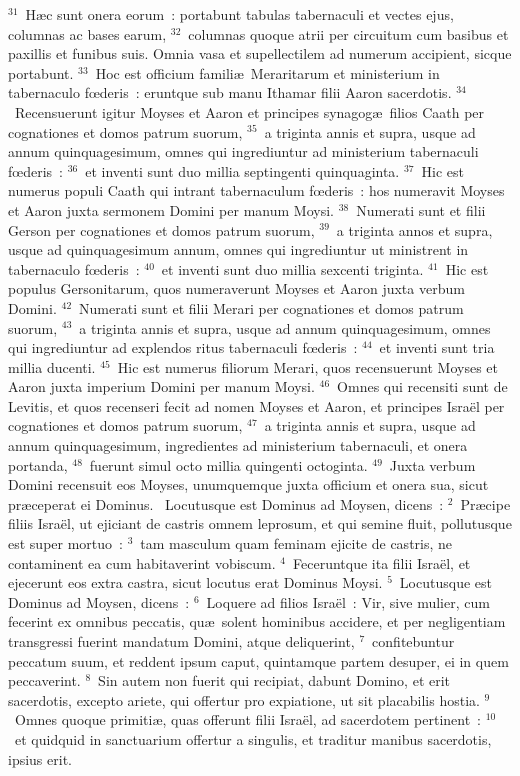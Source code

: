 ${}^{31}$~H\ae c sunt onera eorum~: portabunt tabulas tabernaculi et vectes ejus, columnas ac bases earum,
${}^{32}$~columnas quoque atrii per circuitum cum basibus et paxillis et funibus suis. Omnia vasa et supellectilem ad numerum accipient, sicque portabunt.
${}^{33}$~Hoc est officium famili\ae\ Meraritarum et ministerium in tabernaculo fœderis~: eruntque sub manu Ithamar filii Aaron sacerdotis.
${}^{34}$~Recensuerunt igitur Moyses et Aaron et principes synagog\ae\ filios Caath per cognationes et domos patrum suorum,
${}^{35}$~a triginta annis et supra, usque ad annum quinquagesimum, omnes qui ingrediuntur ad ministerium tabernaculi fœderis~:
${}^{36}$~et inventi sunt duo millia septingenti quinquaginta.
${}^{37}$~Hic est numerus populi Caath qui intrant tabernaculum fœderis~: hos numeravit Moyses et Aaron juxta sermonem Domini per manum Moysi.
${}^{38}$~Numerati sunt et filii Gerson per cognationes et domos patrum suorum,
${}^{39}$~a triginta annos et supra, usque ad quinquagesimum annum, omnes qui ingrediuntur ut ministrent in tabernaculo fœderis~:
${}^{40}$~et inventi sunt duo millia sexcenti triginta.
${}^{41}$~Hic est populus Gersonitarum, quos numeraverunt Moyses et Aaron juxta verbum Domini.
${}^{42}$~Numerati sunt et filii Merari per cognationes et domos patrum suorum,
${}^{43}$~a triginta annis et supra, usque ad annum quinquagesimum, omnes qui ingrediuntur ad explendos ritus tabernaculi fœderis~:
${}^{44}$~et inventi sunt tria millia ducenti.
${}^{45}$~Hic est numerus filiorum Merari, quos recensuerunt Moyses et Aaron juxta imperium Domini per manum Moysi.
${}^{46}$~Omnes qui recensiti sunt de Levitis, et quos recenseri fecit ad nomen Moyses et Aaron, et principes Isra\"el per cognationes et domos patrum suorum,
${}^{47}$~a triginta annis et supra, usque ad annum quinquagesimum, ingredientes ad ministerium tabernaculi, et onera portanda,
${}^{48}$~fuerunt simul octo millia quingenti octoginta.
${}^{49}$~Juxta verbum Domini recensuit eos Moyses, unumquemque juxta officium et onera sua, sicut pr\ae ceperat ei Dominus.
~\lettrine[lines=10,image=true,loversize=0.05,lraise=-0.03]{L}{}ocutusque est Dominus ad Moysen, dicens~:
${}^{2}$~Pr\ae cipe filiis Isra\"el, ut ejiciant de castris omnem leprosum, et qui semine fluit, pollutusque est super mortuo~:
${}^{3}$~tam masculum quam feminam ejicite de castris, ne contaminent ea cum habitaverint vobiscum.
${}^{4}$~Feceruntque ita filii Isra\"el, et ejecerunt eos extra castra, sicut locutus erat Dominus Moysi.
${}^{5}$~Locutusque est Dominus ad Moysen, dicens~:
${}^{6}$~Loquere ad filios Isra\"el~: Vir, sive mulier, cum fecerint ex omnibus peccatis, qu\ae\ solent hominibus accidere, et per negligentiam transgressi fuerint mandatum Domini, atque deliquerint,
${}^{7}$~confitebuntur peccatum suum, et reddent ipsum caput, quintamque partem desuper, ei in quem peccaverint.
${}^{8}$~Sin autem non fuerit qui recipiat, dabunt Domino, et erit sacerdotis, excepto ariete, qui offertur pro expiatione, ut sit placabilis hostia.
${}^{9}$~Omnes quoque primiti\ae , quas offerunt filii Isra\"el, ad sacerdotem pertinent~:
${}^{10}$~et quidquid in sanctuarium offertur a singulis, et traditur manibus sacerdotis, ipsius erit.


